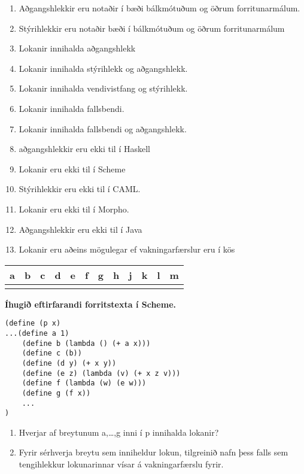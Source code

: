 \documentclass{article}
\newcommand{\bo}[1]{\textbf{#1}}
\newcommand{\enum}{\begin{enumerate}[label = \alph*.]}
\begin{document}
\enum
\item Aðgangshlekkir eru notaðir í bæði bálkmótuðum og öðrum
forritunarmálum.
\item Stýrihlekkir eru notaðir bæði í bálkmótuðum og öðrum
forritunarmálum
\item Lokanir innihalda aðgangshlekk
\item Lokanir innihalda stýrihlekk og aðgangshlekk.
\item Lokanir innihalda vendivistfang og stýrihlekk.
\item Lokanir innihalda fallsbendi.
\item Lokanir innihalda fallsbendi og aðgangshlekk.
\item aðgangshlekkir eru ekki til í Haskell
\item Lokanir eru ekki til í Scheme
\item Stýrihlekkir eru ekki til í CAML.
\item Lokanir eru ekki til í Morpho.
\item Aðgangshlekkir eru ekki til í Java
\item Lokanir eru aðeins mögulegar ef vakningarfærslur eru í kös
\end{enumerate}

\begin{tabularx}{\textwidth}{|X|X|X|X|X|X|X|X|X|X|X|X|}
    \hline
    \bo{a} & \bo{b} & \bo{c} & \bo{d} & \bo{e} & \bo{f} & \bo{g} & \bo{h} & \bo{j} & \bo{k} & \bo{l} & \bo{m}  \\ \hline
     & & & & & & & & & & &  \\ \hline
\end{tabularx}

\newpage

\bo{Íhugið eftirfarandi forritstexta í Scheme.}

\begin{verbatim}
(define (p x)
...(define a 1)
    (define b (lambda () (+ a x)))
    (define c (b))
    (define (d y) (+ x y))
    (define (e z) (lambda (v) (+ x z v)))
    (define f (lambda (w) (e w)))
    (define g (f x))
    ...
)
\end{verbatim}

\enum
\item Hverjar af breytunum a,…,g inni í p innihalda lokanir?
\item Fyrir sérhverja breytu sem inniheldur lokun, tilgreinið nafn
      þess falls sem tengihlekkur lokunarinnar vísar á
      vakningarfærslu fyrir.
\end{enumerate}
\end{document}
